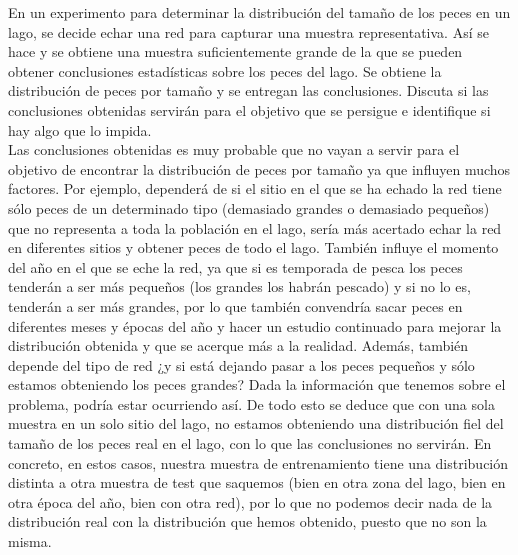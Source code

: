 \documentclass[12pt]{article}
\theoremstyle{definition}
\begin{document}
\begin{pregunta}
En un experimento para determinar la distribución del tamaño de los peces en un lago, se decide echar una red para capturar una muestra representativa. Así se hace y se obtiene una muestra suficientemente grande de la que se pueden obtener conclusiones estadísticas sobre los peces del lago. Se obtiene la distribución de peces por tamaño y se entregan las conclusiones. Discuta si las conclusiones obtenidas servirán para el objetivo que se persigue e identifique si hay algo que lo impida.\\

Las conclusiones obtenidas es muy probable que no vayan a servir para el objetivo de encontrar la distribución de peces por tamaño ya que influyen muchos factores. Por ejemplo, dependerá de si el sitio en el que se ha echado la red tiene sólo peces de un determinado tipo (demasiado grandes o demasiado pequeños) que no representa a toda la población en el lago, sería más acertado echar la red en diferentes sitios y obtener peces de todo el lago. También influye el momento del año en el que se eche la red, ya que si es temporada de pesca los peces tenderán a ser más pequeños (los grandes los habrán pescado) y si no lo es, tenderán a ser más grandes, por lo que también convendría sacar peces en diferentes meses y épocas del año y hacer un estudio continuado para mejorar la distribución obtenida y que se acerque más a la realidad. Además, también depende del tipo de red ¿y si está dejando pasar a los peces pequeños y sólo estamos obteniendo los peces grandes? Dada la información que tenemos sobre el problema, podría estar ocurriendo así. De todo esto se deduce que con una sola muestra en un solo sitio del lago, no estamos obteniendo una distribución fiel del tamaño de los peces real en el lago, con lo que las conclusiones no servirán. En concreto, en estos casos, nuestra muestra de entrenamiento tiene una distribución distinta a otra muestra de test que saquemos (bien en otra zona del lago, bien en otra época del año, bien con otra red), por lo que no podemos decir nada de la distribución real con la distribución que hemos obtenido, puesto que no son la misma.
\end{pregunta}
\end{document}
